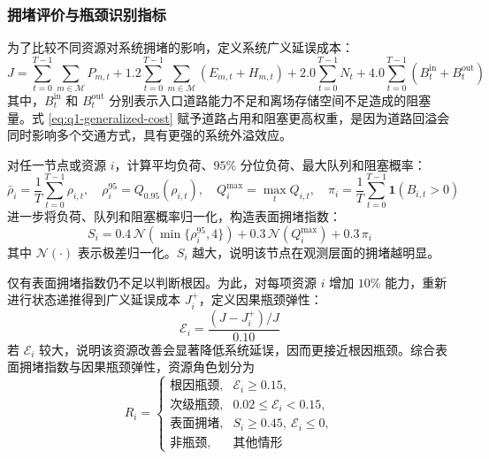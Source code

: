 \documentclass[UTF8,a4paper,11pt,onecolumn,fontset=none]{ctexart}
\begin{document}
\subsubsection{拥堵评价与瓶颈识别指标}

为了比较不同资源对系统拥堵的影响，定义系统广义延误成本：
\begin{equation}
  J=\sum_{t=0}^{T-1}\sum_{m\in\mathcal M}P_{m,t}
  +1.2\sum_{t=0}^{T-1}\sum_{m\in\mathcal M}(E_{m,t}+H_{m,t})
  +2.0\sum_{t=0}^{T-1}N_t
  +4.0\sum_{t=0}^{T-1}(B_t^{\mathrm{in}}+B_t^{\mathrm{out}})
  \label{eq:q1-generalized-cost}
\end{equation}
其中，$B_t^{\mathrm{in}}$ 和 $B_t^{\mathrm{out}}$ 分别表示入口道路能力不足和离场存储空间不足造成的阻塞量。式 \eqref{eq:q1-generalized-cost} 赋予道路占用和阻塞更高权重，是因为道路回溢会同时影响多个交通方式，具有更强的系统外溢效应。

对任一节点或资源 $i$，计算平均负荷、$95\%$ 分位负荷、最大队列和阻塞概率：
\begin{equation}
  \bar \rho_i=\frac{1}{T}\sum_{t=0}^{T-1}\rho_{i,t},
  \quad
  \rho_i^{95}=Q_{0.95}(\rho_{i,t}),
  \quad
  Q_i^{\max}=\max_t Q_{i,t},
  \quad
  \pi_i=\frac{1}{T}\sum_{t=0}^{T-1}\mathbf 1(B_{i,t}>0)
  \label{eq:q1-node-diagnostics}
\end{equation}
进一步将负荷、队列和阻塞概率归一化，构造表面拥堵指数：
\begin{equation}
  S_i=0.4\,\mathcal N(\min\{\rho_i^{95},4\})
  +0.3\,\mathcal N(Q_i^{\max})
  +0.3\,\pi_i
  \label{eq:q1-surface-score}
\end{equation}
其中 $\mathcal N(\cdot)$ 表示极差归一化。$S_i$ 越大，说明该节点在观测层面的拥堵越明显。

仅有表面拥堵指数仍不足以判断根因。为此，对每项资源 $i$ 增加 $10\%$ 能力，重新进行状态递推得到广义延误成本 $J_i^{+}$，定义因果瓶颈弹性：
\begin{equation}
  \mathcal E_i=\frac{(J-J_i^{+})/J}{0.10}
  \label{eq:q1-bottleneck-elasticity}
\end{equation}
若 $\mathcal E_i$ 较大，说明该资源改善会显著降低系统延误，因而更接近根因瓶颈。综合表面拥堵指数与因果瓶颈弹性，资源角色划分为
\begin{equation}
  R_i=
  \begin{cases}
    \text{根因瓶颈}, & \mathcal E_i\ge 0.15,\\
    \text{次级瓶颈}, & 0.02\le \mathcal E_i<0.15,\\
    \text{表面拥堵}, & S_i\ge0.45,\ \mathcal E_i\le0,\\
    \text{非瓶颈}, & \text{其他情形}
  \end{cases}
  \label{eq:q1-role-classification}
\end{equation}
\end{document}

